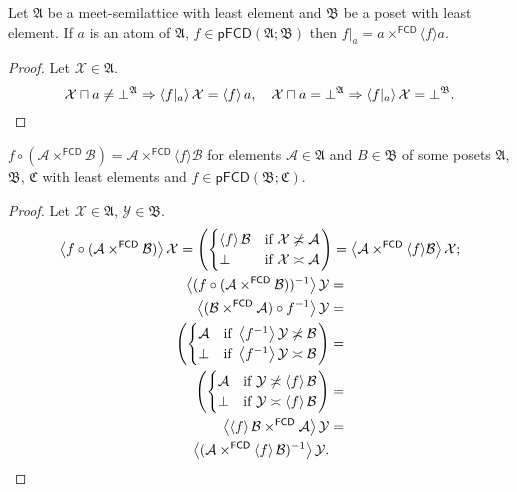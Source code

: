 \begin{prop}
Let $\mathfrak{A}$ be a meet-semilattice with least element and $\mathfrak{B}$
be a poset with least element. If $a$ is an atom of $\mathfrak{A}$,
$f\in\mathsf{pFCD}(\mathfrak{A};\mathfrak{B})$ then $f|_{a}=a\times^{\mathsf{FCD}}\langle f\rangle a$.\end{prop}
\begin{proof}
Let $\mathcal{X}\in\mathfrak{A}$. 
\[
\mathcal{X}\sqcap a\neq\bot^{\mathfrak{A}}\Rightarrow\left\langle f|_{a}\right\rangle\mathcal{X}=\left\langle f\right\rangle a,\hspace{1em}\mathcal{X}\sqcap a=\bot^{\mathfrak{A}}\Rightarrow\left\langle f|_{a}\right\rangle\mathcal{X}=\bot^{\mathfrak{B}}.
\]
\end{proof}
\begin{prop}
$f\circ(\mathcal{A}\times^{\mathsf{FCD}}\mathcal{B})=\mathcal{A}\times^{\mathsf{FCD}}\langle f\rangle\mathcal{B}$
for elements $\mathcal{A}\in\mathfrak{A}$ and $B\in\mathfrak{B}$
of some posets $\mathfrak{A}$, $\mathfrak{B}$, $\mathfrak{C}$ with
least elements and $f\in\mathsf{pFCD}(\mathfrak{B};\mathfrak{C})$.\end{prop}
\begin{proof}
Let $\mathcal{X}\in\mathfrak{A}$, $\mathcal{Y}\in\mathfrak{B}$.
\begin{gather*}
\left\langle f\circ(\mathcal{A}\times^{\mathsf{FCD}}\mathcal{B})\right\rangle\mathcal{X}=\left(\begin{cases}
\left\langle f\right\rangle\mathcal{B} & \text{if }\mathcal{X}\not\asymp\mathcal{A}\\
\bot & \text{if }\mathcal{X}\asymp\mathcal{A}
\end{cases}\right)=\left\langle \mathcal{A}\times^{\mathsf{FCD}}\langle f\rangle\mathcal{B}\right\rangle\mathcal{X};\\
\begin{aligned}\left\langle (f\circ(\mathcal{A}\times^{\mathsf{FCD}}\mathcal{B}))^{-1}\right\rangle\mathcal{Y} & =\\
\left\langle (\mathcal{B}\times^{\mathsf{FCD}}\mathcal{A})\circ f^{-1}\right\rangle\mathcal{Y} & =\\
\left(\begin{cases}
\mathcal{A} & \text{if }\left\langle f^{-1}\right\rangle\mathcal{Y}\not\asymp\mathcal{B}\\
\bot & \text{if }\left\langle f^{-1}\right\rangle\mathcal{Y}\asymp\mathcal{B}
\end{cases}\right) & =\\
\left(\begin{cases}
\mathcal{A} & \text{if }\mathcal{Y}\not\asymp\left\langle f\right\rangle\mathcal{B}\\
\bot & \text{if }\mathcal{Y}\asymp\left\langle f\right\rangle\mathcal{B}
\end{cases}\right) & =\\
\left\langle \left\langle f\right\rangle\mathcal{B}\times^{\mathsf{FCD}}\mathcal{A}\right\rangle\mathcal{Y} & =\\
\left\langle (\mathcal{A}\times^{\mathsf{FCD}}\left\langle f\right\rangle\mathcal{B})^{-1}\right\rangle\mathcal{Y}.
\end{aligned}
\end{gather*}

\end{proof}

